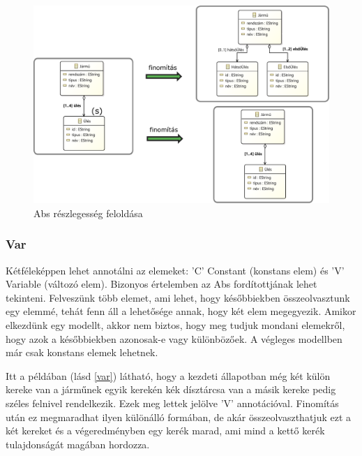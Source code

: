 \begin{figure}[htp]
	\centering
	\includegraphics[width=130mm, keepaspectratio]{figures/abs.pdf}
	\caption{Abs részlegesség feloldása} 
	\label{abs}
\end{figure}

\subsubsection{Var}
Kétféleképpen lehet annotálni az elemeket: \textsf{’C’} Constant (konstans elem) és \textsf{’V’} Variable (változó elem). Bizonyos értelemben az Abs fordítottjának lehet tekinteni. Felveszünk több elemet, ami lehet, hogy későbbiekben összeolvasztunk egy elemmé, tehát fenn áll a lehetősége annak, hogy két elem megegyezik. Amikor elkezdünk egy modellt, akkor nem biztos, hogy meg tudjuk mondani elemekről, hogy azok a későbbiekben azonosak-e vagy különbözőek. A végleges modellben már csak konstans elemek lehetnek.
\par
Itt a példában (lásd \autoref{var}) látható, hogy a kezdeti állapotban még két külön kereke van a járműnek egyik kerekén kék dísztárcsa van a másik kereke pedig széles felnivel rendelkezik. Ezek meg lettek jelölve \textsf{'V'} annotációval. Finomítás után ez megmaradhat ilyen különálló formában, de akár összeolvaszthatjuk ezt a két kereket és a végeredményben egy kerék marad, ami mind a kettő kerék tulajdonságát magában hordozza.

